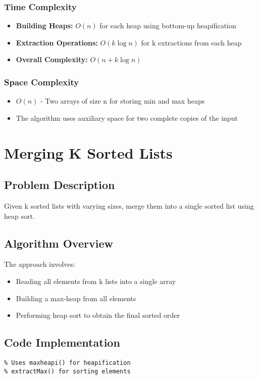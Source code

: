 \documentclass[12pt]{article}
\begin{document}
\subsubsection{Time Complexity}
\begin{itemize}
    \item \textbf{Building Heaps:} $O(n)$ for each heap using bottom-up heapification
    \item \textbf{Extraction Operations:} $O(k \log n)$ for k extractions from each heap
    \item \textbf{Overall Complexity:} $O(n + k \log n)$
\end{itemize}

\subsubsection{Space Complexity}
\begin{itemize}
    \item $O(n)$ - Two arrays of size n for storing min and max heaps
    \item The algorithm uses auxiliary space for two complete copies of the input
\end{itemize}

\section{Merging K Sorted Lists}
\subsection{Problem Description}
Given k sorted lists with varying sizes, merge them into a single sorted list using heap sort.

\subsection{Algorithm Overview}
The approach involves:
\begin{itemize}
    \item Reading all elements from k lists into a single array
    \item Building a max-heap from all elements
    \item Performing heap sort to obtain the final sorted order
\end{itemize}

\subsection{Code Implementation}
\begin{lstlisting}[caption={Merging K Sorted Lists - lab3q3.cpp}]
% CODE TO BE INSERTED HERE
% Uses maxheapi() for heapification
% extractMax() for sorting elements
\end{lstlisting}
\end{document}

